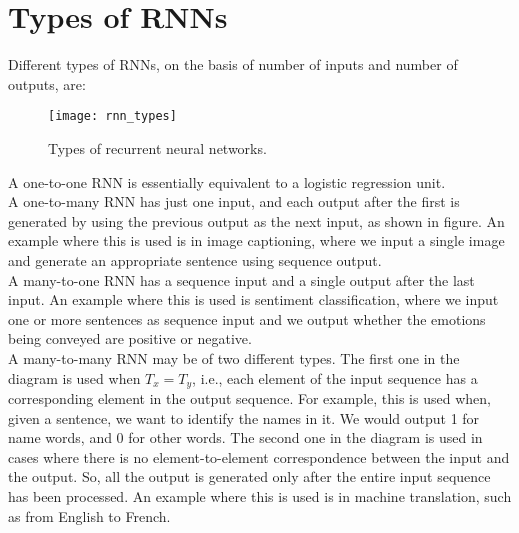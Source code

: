 \documentclass[a4paper, 12pt]{report}
\begin{document}
\section{Types of RNNs}
Different types of RNNs, on the basis of number of inputs and number of outputs, are:
\begin{figure}[H]
\centering
\texttt{[image: rnn\_types]}
\caption{Types of recurrent neural networks.}
\end{figure}
A one-to-one RNN is essentially equivalent to a logistic regression unit.\\
\break
A one-to-many RNN has just one input, and each output after the first is generated by using the previous output as the next input, as shown in figure. An example where this is used is in image captioning, where we input a single image and generate an appropriate sentence using sequence output.\\
\break
A many-to-one RNN has a sequence input and a single output after the last input. An example where this is used is sentiment classification, where we input one or more sentences as sequence input and we output whether the emotions being conveyed are positive or negative.\\
\break
A many-to-many RNN may be of two different types. The first one in the diagram is used when $T_x = T_y$, i.e., each element of the input sequence has a corresponding element in the output sequence. For example, this is used when, given a sentence, we want to identify the names in it. We would output 1 for name words, and 0 for other words. The second one in the diagram is used in cases where there is no element-to-element correspondence between the input and the output. So, all the output is generated only after the entire input sequence has been processed. An example where this is used is in machine translation, such as from English to French.
\end{document}
